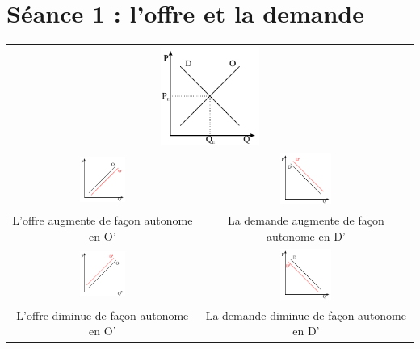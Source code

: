 \section{Séance 1 : l'offre et la demande}

\begin{center}
    \begin{tabular}{cc}
        \multicolumn{2}{c}{\includegraphics[width=0.25\textwidth]{images/graph_equilibre.pdf}}\\
        \includegraphics[width=0.25\textwidth]{images/graph_offre_augmente.pdf}&
        \includegraphics[width=0.25\textwidth]{images/graph_demande_augmente.pdf}\\
        L'offre \textcolor[rgb]{1,0,0}{augmente} de façon autonome en \textcolor[rgb]{1,0,0}{O'}&La demande \textcolor[rgb]{1,0,0}{augmente} de façon autonome en \textcolor[rgb]{1,0,0}{D'}\\
        \includegraphics[width=0.25\textwidth]{images/graph_offre_diminue.pdf}&
        \includegraphics[width=0.25\textwidth]{images/graph_demande_diminue.pdf}\\
        L'offre \textcolor[rgb]{1,0,0}{diminue} de façon autonome en \textcolor[rgb]{1,0,0}{O'}&La demande \textcolor[rgb]{1,0,0}{diminue} de façon autonome en \textcolor[rgb]{1,0,0}{D'}
    \end{tabular}
\end{center}

